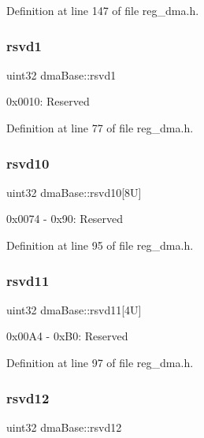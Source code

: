 Definition at line 147 of file reg\+\_\+dma.\+h.

\mbox{\label{structdmaBase_a92ed871763abf5e41bb6f897153a0661}} 
\subsubsection{\texorpdfstring{rsvd1}{rsvd1}}
{\footnotesize\ttfamily uint32 dma\+Base\+::rsvd1}

0x0010\+: Reserved 

Definition at line 77 of file reg\+\_\+dma.\+h.

\mbox{\label{structdmaBase_a00218a961fb28dfaf2afc80ff3e72164}} 
\subsubsection{\texorpdfstring{rsvd10}{rsvd10}}
{\footnotesize\ttfamily uint32 dma\+Base\+::rsvd10\mbox{[}8\+U\mbox{]}}

0x0074 -\/ 0x90\+: Reserved 

Definition at line 95 of file reg\+\_\+dma.\+h.

\mbox{\label{structdmaBase_a4d72a1435ccf3f3a02002579d1ba268b}} 
\subsubsection{\texorpdfstring{rsvd11}{rsvd11}}
{\footnotesize\ttfamily uint32 dma\+Base\+::rsvd11\mbox{[}4\+U\mbox{]}}

0x00\+A4 -\/ 0x\+B0\+: Reserved 

Definition at line 97 of file reg\+\_\+dma.\+h.

\mbox{\label{structdmaBase_aa6766a1ba808ed30a6576a77367c1414}} 
\subsubsection{\texorpdfstring{rsvd12}{rsvd12}}
{\footnotesize\ttfamily uint32 dma\+Base\+::rsvd12}

